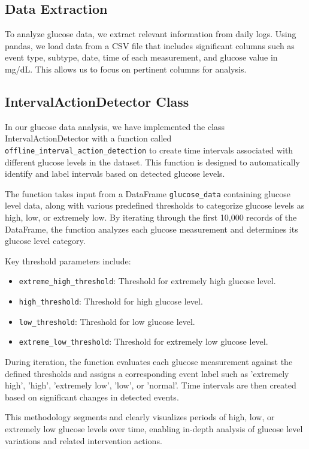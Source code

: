 \documentclass{article}
\begin{document}
\subsection{Data Extraction}

To analyze glucose data, we extract relevant information from daily logs. Using pandas, we load data from a CSV file that includes significant columns such as event type, subtype, date, time of each measurement, and glucose value in mg/dL. This allows us to focus on pertinent columns for analysis.

\subsection{IntervalActionDetector Class}

In our glucose data analysis, we have implemented the class IntervalActionDetector with a function called \texttt{offline\_interval\_action\_detection} to create time intervals associated with different glucose levels in the dataset. This function is designed to automatically identify and label intervals based on detected glucose levels.

The function takes input from a DataFrame \texttt{glucose\_data} containing glucose level data, along with various predefined thresholds to categorize glucose levels as high, low, or extremely low. By iterating through the first 10,000 records of the DataFrame, the function analyzes each glucose measurement and determines its glucose level category.

Key threshold parameters include:
\begin{itemize}
    \item \texttt{extreme\_high\_threshold}: Threshold for extremely high glucose level.
    \item \texttt{high\_threshold}: Threshold for high glucose level.
    \item \texttt{low\_threshold}: Threshold for low glucose level.
    \item \texttt{extreme\_low\_threshold}: Threshold for extremely low glucose level.
\end{itemize}

During iteration, the function evaluates each glucose measurement against the defined thresholds and assigns a corresponding event label such as 'extremely high', 'high', 'extremely low', 'low', or 'normal'. Time intervals are then created based on significant changes in detected events.

This methodology segments and clearly visualizes periods of high, low, or extremely low glucose levels over time, enabling in-depth analysis of glucose level variations and related intervention actions.
\end{document}
